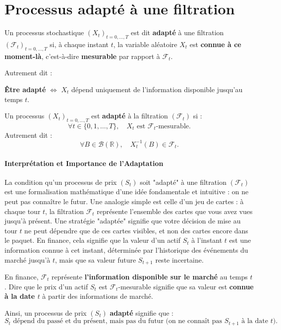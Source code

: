 \section{Processus adapté à une filtration}

\begin{tcolorbox}[title=Intuition générale, colback=green!5!white, colframe=green!50!black]
Un processus stochastique $(X_t)_{t=0,\dots,T}$ est dit \textbf{adapté} à une filtration $(\mathcal{F}_t)_{t=0,\dots,T}$ si, à chaque instant $t$, 
la variable aléatoire $X_t$ est \textbf{connue à ce moment-là}, c'est-à-dire \textbf{mesurable} par rapport à $\mathcal{F}_t$.

\medskip
Autrement dit :
\begin{center}
\textbf{Être adapté} $\Longleftrightarrow$ $X_t$ dépend uniquement de l'information disponible jusqu'au temps $t$.
\end{center}
\end{tcolorbox}

\begin{definition}
Un processus $(X_t)_{t=0,\dots,T}$ est \textbf{adapté} à la filtration $(\mathcal{F}_t)$ si :
\[
\forall t \in \{0,1,\dots,T\}, \quad X_t \text{ est } \mathcal{F}_t\text{-mesurable.}
\]
Autrement dit :
\[
\forall B \in \mathcal{B}(\mathbb{R}), \quad X_t^{-1}(B) \in \mathcal{F}_t.
\]
\end{definition}

\paragraph*{Interprétation et Importance de l'Adaptation}
La condition qu'un processus de prix $(S_t)$ soit "adapté" à une filtration $(\mathcal{F}_t)$ est une formalisation mathématique d'une idée fondamentale et intuitive : on ne peut pas connaître le futur. Une analogie simple est celle d'un jeu de cartes : à chaque tour $t$, la filtration $\mathcal{F}_t$ représente l'ensemble des cartes que vous avez vues jusqu'à présent. Une stratégie "adaptée" signifie que votre décision de mise au tour $t$ ne peut dépendre que de ces cartes visibles, et non des cartes encore dans le paquet. En finance, cela signifie que la valeur d'un actif $S_t$ à l'instant $t$ est une information connue à cet instant, déterminée par l'historique des événements du marché jusqu'à $t$, mais que sa valeur future $S_{t+1}$ reste incertaine.


\begin{exemple} 
En finance, $\mathcal{F}_t$ représente \textbf{l'information disponible sur le marché} au temps $t$.
Dire que le prix d'un actif $S_t$ est $\mathcal{F}_t$-mesurable signifie que sa valeur est \textbf{connue à la date $t$}
à partir des informations de marché.

Ainsi, un processus de prix $(S_t)$ \textbf{adapté} signifie que :
\[
S_t \text{ dépend du passé et du présent, mais pas du futur (on ne connaît pas } S_{t+1} \text{ à la date } t).
\]
\end{exemple}



